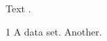 \documentclass{article}
\begin{document}
Text \nocite{ds}.
\begin{thebibliography}{1}
 A data set.
 Another.
\end{thebibliography}
\end{document}
